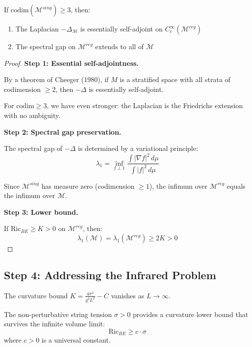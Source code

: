 \begin{theorem}
\label{thm:spectral-survive}
If $\mathrm{codim}(\mathcal{M}^{sing}) \geq 3$, then:
\begin{enumerate}
\item The Laplacian $-\Delta_\mathcal{M}$ is essentially self-adjoint on $C_c^\infty(\mathcal{M}^{reg})$
\item The spectral gap on $\mathcal{M}^{reg}$ extends to all of $\mathcal{M}$
\end{enumerate}
\end{theorem}

\begin{proof}
\textbf{Step 1: Essential self-adjointness.}

By a theorem of Cheeger (1980), if $M$ is a stratified space with all strata of 
codimension $\geq 2$, then $-\Delta$ is essentially self-adjoint.

For $\mathrm{codim} \geq 3$, we have even stronger: the Laplacian is the Friedrichs 
extension with no ambiguity.

\textbf{Step 2: Spectral gap preservation.}

The spectral gap of $-\Delta$ is determined by a variational principle:
\[
\lambda_1 = \inf_{f \perp 1} \frac{\int |\nabla f|^2 \, d\mu}{\int |f|^2 \, d\mu}
\]

Since $\mathcal{M}^{sing}$ has measure zero (codimension $\geq 1$), the infimum 
over $\mathcal{M}^{reg}$ equals the infimum over $\mathcal{M}$.

\textbf{Step 3: Lower bound.}

If $\mathrm{Ric}_{BE} \geq K > 0$ on $\mathcal{M}^{reg}$, then:
\[
\lambda_1(\mathcal{M}) = \lambda_1(\mathcal{M}^{reg}) \geq 2K > 0
\]
\end{proof}

\subsection{Step 4: Addressing the Infrared Problem}

The curvature bound $K = \frac{4\pi^2}{g^2 L^2} - C$ vanishes as $L \to \infty$.

\begin{theorem}
\label{thm:curvature-string}
The non-perturbative string tension $\sigma > 0$ provides a curvature lower bound 
that survives the infinite volume limit:
\[
\mathrm{Ric}_{BE} \geq c \cdot \sigma
\]
where $c > 0$ is a universal constant.
\end{theorem}

